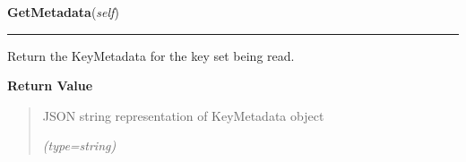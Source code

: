     \label{keyczar:readers:Reader:GetMetadata}

    \vspace{0.5ex}

\hspace{.8\funcindent}\begin{boxedminipage}{\funcwidth}

    \raggedright \textbf{GetMetadata}(\textit{self})

    \vspace{-1.5ex}

    \rule{\textwidth}{0.5\fboxrule}
\setlength{\parskip}{2ex}
    Return the KeyMetadata for the key set being read.

\setlength{\parskip}{1ex}
      \textbf{Return Value}
    \vspace{-1ex}

      \begin{quote}
      JSON string representation of KeyMetadata object

      {\it (type=string)}

      \end{quote}

    \end{boxedminipage}

    \label{keyczar:readers:Reader:GetKey}

    \vspace{0.5ex}

